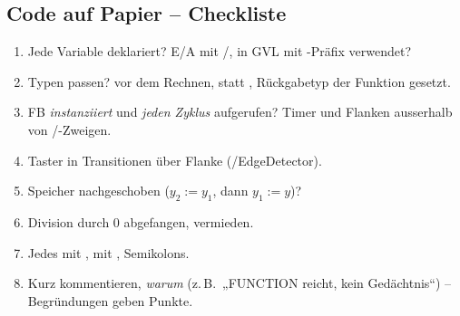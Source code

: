 \subsection{Code auf Papier -- Checkliste}
\begin{rezept}
\begin{enumerate}
\item Jede Variable deklariert? E/A mit /,
  in GVL mit -Präfix verwendet?
\item Typen passen?  vor dem Rechnen,  statt
  , Rückgabetyp der Funktion gesetzt.
\item FB \emph{instanziiert} und \emph{jeden Zyklus} aufgerufen? Timer
  und Flanken ausserhalb von /-Zweigen.
\item Taster in Transitionen über Flanke (/EdgeDetector).
\item Speicher nachgeschoben ($y_2:=y_1$, dann $y_1:=y$)?
\item Division durch 0 abgefangen,  vermieden.
\item Jedes  mit ,  mit , Semikolons.
\item Kurz kommentieren, \emph{warum} (z.\,B.\ „FUNCTION reicht, kein
  Gedächtnis“) -- Begründungen geben Punkte.
\end{enumerate}
\end{rezept}

